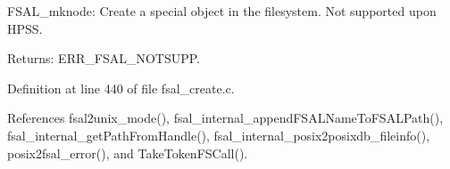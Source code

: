 FSAL\_\-mknode: Create a special object in the filesystem. Not supported upon HPSS.

\begin{Desc}
\item[Returns:]ERR\_\-FSAL\_\-NOTSUPP. \end{Desc}


Definition at line 440 of file fsal\_\-create.c.

References fsal2unix\_\-mode(), fsal\_\-internal\_\-appendFSALNameToFSALPath(), fsal\_\-internal\_\-getPathFromHandle(), fsal\_\-internal\_\-posix2posixdb\_\-fileinfo(), posix2fsal\_\-error(), and TakeTokenFSCall().